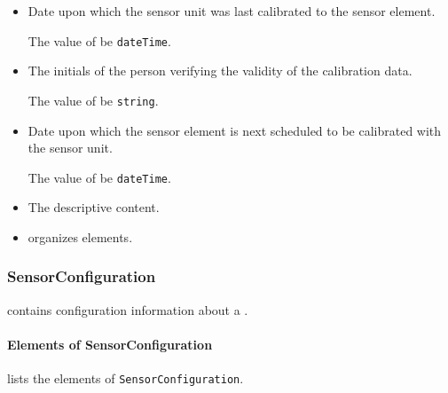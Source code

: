 \begin{itemize}

\item {} \newline Date upon which the \gls{sensor unit} was last calibrated to the \gls{sensor element}.

The value of  \MUST be \texttt{dateTime}.

\item {} \newline The initials of the person verifying the validity of the calibration data.

The value of  \MUST be \texttt{string}.

\item {} \newline Date upon which the \gls{sensor element} is next scheduled to be calibrated with the \gls{sensor unit}.


The value of  \MUST be \texttt{dateTime}.

\item {} \newline The descriptive content.

\item {} \newline {} \glspl{organize}  elements.

\end{itemize}

\subsubsection{SensorConfiguration}
\label{sec:SensorConfiguration}



 contains configuration information about a .


\paragraph{Elements of SensorConfiguration}\mbox{}
\label{sec:Elements of SensorConfiguration}

 lists the elements of \texttt{SensorConfiguration}.


